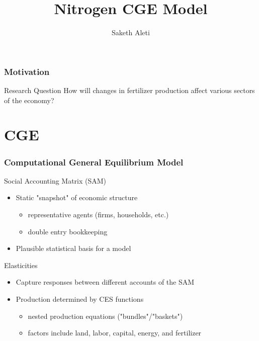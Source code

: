 \documentclass[11pt]{beamer}
\begin{document}
	\author{Saketh Aleti}
	\title{Nitrogen CGE Model}
	\begin{frame}[plain]
	\maketitle
\end{frame}

\begin{frame}
\frametitle{Motivation}

	\begin{block}{Research Question}
		How will changes in fertilizer production affect various sectors of the economy?
	\end{block}

\end{frame}


\section{CGE}

\begin{frame}
\frametitle{Computational General Equilibrium Model}

\begin{block}
	{Social Accounting Matrix (SAM)}
	\begin{itemize}
		\item Static "snapshot" of economic structure
		\begin{itemize}
			\item representative agents (firms, households, etc.)
			\item double entry bookkeeping 
		\end{itemize}
		\item Plausible statistical basis for a model
	\end{itemize}
\end{block}

\begin{block}
	{Elasticities}
	\begin{itemize}
		\item Capture responses between different accounts of the SAM
		\item Production determined by CES functions
		\begin{itemize}
			\item nested production equations ("bundles"/"baskets")
			\item factors include land, labor, capital, energy, and fertilizer 
		\end{itemize}
	\end{itemize}
\end{block}

\end{frame}
\end{document}
